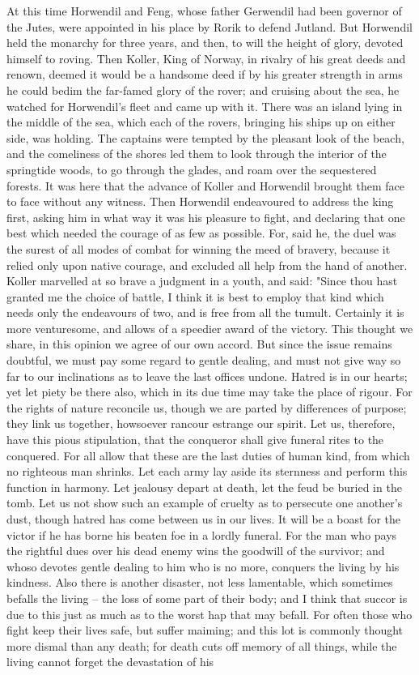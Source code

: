 \documentclass[10pt,a4paper]{report}
\begin{document}
At this time Horwendil and Feng, whose father Gerwendil had been governor of the Jutes, were appointed in his place by Rorik to defend Jutland. But Horwendil held the monarchy for three years, and then, to will the height of glory, devoted himself to roving. Then Koller, King of Norway, in rivalry of his great deeds and renown, deemed it would be a handsome deed if by his greater strength in arms he could bedim the far-famed glory of the rover; and cruising about the sea, he watched for Horwendil's fleet and came up with it. There was an island lying in the middle of the sea, which each of the rovers, bringing his ships up on either side, was holding. The captains were tempted by the pleasant look of the beach, and the comeliness of the shores led them to look through the interior of the springtide woods, to go through the glades, and roam over the sequestered forests. It was here that the advance of Koller and Horwendil brought them face to face without any witness. Then Horwendil endeavoured to address the king first, asking him in what way it was his pleasure to fight, and declaring that one best which needed the courage of as few as possible. For, said he, the duel was the surest of all modes of combat for winning the meed of bravery, because it relied only upon native courage, and excluded all help from the hand of another. Koller marvelled at so brave a judgment in a youth, and said: "Since thou hast granted me the choice of battle, I think it is best to employ that kind which needs only the endeavours of two, and is free from all the tumult. Certainly it is more venturesome, and allows of a speedier award of the victory. This thought we share, in this opinion we agree of our own accord. But since the issue remains doubtful, we must pay some regard to gentle dealing, and must not give way so far to our inclinations as to leave the last offices undone. Hatred is in our hearts; yet let piety be there also, which in its due time may take the place of rigour. For the rights of nature reconcile us, though we are parted by differences of purpose; they link us together, howsoever rancour estrange our spirit. Let us, therefore, have this pious stipulation, that the conqueror shall give funeral rites to the conquered. For all allow that these are the last duties of human kind, from which no righteous man shrinks. Let each army lay aside its sternness and perform this function in harmony. Let jealousy depart at death, let the feud be buried in the tomb. Let us not show such an example of cruelty as to persecute one another's dust, though hatred has come between us in our lives. It will be a boast for the victor if he has borne his beaten foe in a lordly funeral. For the man who pays the rightful dues over his dead enemy wins the goodwill of the survivor; and whoso devotes gentle dealing to him who is no more, conquers the living by his kindness. Also there is another disaster, not less lamentable, which sometimes befalls the living -- the loss of some part of their body; and I think that succor is due to this just as much as to the worst hap that may befall. For often those who fight keep their lives safe, but suffer maiming; and this lot is commonly thought more dismal than any death; for death cuts off memory of all things, while the living cannot forget the devastation of his 
\end{document}
